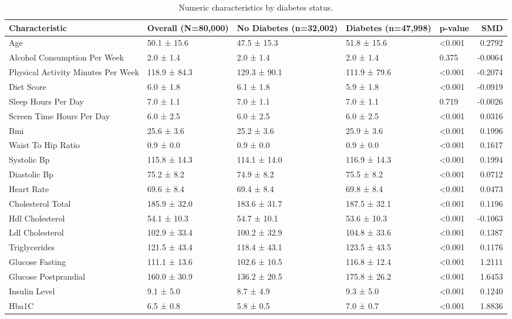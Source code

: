 \begin{table}[H]
\begin{center}
\begin{tabular}{lllllr}
\toprule
Characteristic & Overall (N=80,000) & No Diabetes (n=32,002) & Diabetes (n=47,998) & p-value & SMD \\
\midrule
Age & 50.1 ± 15.6 & 47.5 ± 15.3 & 51.8 ± 15.6 & <0.001 & 0.2792 \\
Alcohol Consumption Per Week & 2.0 ± 1.4 & 2.0 ± 1.4 & 2.0 ± 1.4 & 0.375 & -0.0064 \\
Physical Activity Minutes Per Week & 118.9 ± 84.3 & 129.3 ± 90.1 & 111.9 ± 79.6 & <0.001 & -0.2074 \\
Diet Score & 6.0 ± 1.8 & 6.1 ± 1.8 & 5.9 ± 1.8 & <0.001 & -0.0919 \\
Sleep Hours Per Day & 7.0 ± 1.1 & 7.0 ± 1.1 & 7.0 ± 1.1 & 0.719 & -0.0026 \\
Screen Time Hours Per Day & 6.0 ± 2.5 & 6.0 ± 2.5 & 6.0 ± 2.5 & <0.001 & 0.0316 \\
Bmi & 25.6 ± 3.6 & 25.2 ± 3.6 & 25.9 ± 3.6 & <0.001 & 0.1996 \\
Waist To Hip Ratio & 0.9 ± 0.0 & 0.9 ± 0.0 & 0.9 ± 0.0 & <0.001 & 0.1617 \\
Systolic Bp & 115.8 ± 14.3 & 114.1 ± 14.0 & 116.9 ± 14.3 & <0.001 & 0.1994 \\
Diastolic Bp & 75.2 ± 8.2 & 74.9 ± 8.2 & 75.5 ± 8.2 & <0.001 & 0.0712 \\
Heart Rate & 69.6 ± 8.4 & 69.4 ± 8.4 & 69.8 ± 8.4 & <0.001 & 0.0473 \\
Cholesterol Total & 185.9 ± 32.0 & 183.6 ± 31.7 & 187.5 ± 32.1 & <0.001 & 0.1196 \\
Hdl Cholesterol & 54.1 ± 10.3 & 54.7 ± 10.1 & 53.6 ± 10.3 & <0.001 & -0.1063 \\
Ldl Cholesterol & 102.9 ± 33.4 & 100.2 ± 32.9 & 104.8 ± 33.6 & <0.001 & 0.1387 \\
Triglycerides & 121.5 ± 43.4 & 118.4 ± 43.1 & 123.5 ± 43.5 & <0.001 & 0.1176 \\
Glucose Fasting & 111.1 ± 13.6 & 102.6 ± 10.5 & 116.8 ± 12.4 & <0.001 & 1.2111 \\
Glucose Postprandial & 160.0 ± 30.9 & 136.2 ± 20.5 & 175.8 ± 26.2 & <0.001 & 1.6453 \\
Insulin Level & 9.1 ± 5.0 & 8.7 ± 4.9 & 9.3 ± 5.0 & <0.001 & 0.1240 \\
Hba1C & 6.5 ± 0.8 & 5.8 ± 0.5 & 7.0 ± 0.7 & <0.001 & 1.8836 \\
\bottomrule
\end{tabular}
\end{center}
\vspace{-5pt}
\caption{Numeric characteristics by diabetes status.}
\label{tab:numeric_characteristics_by_diabetes_status}
\end{table}
